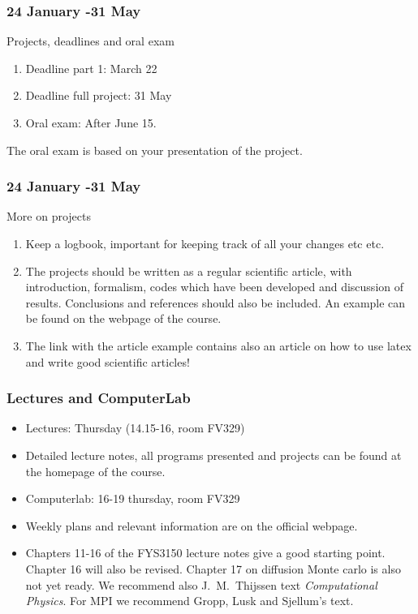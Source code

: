 \documentclass[compress]{beamer}
\begin{document}
\frame
{
  \frametitle{24 January -31 May}
  \begin{block}{Projects, deadlines and oral exam}
\begin{enumerate}
\item Deadline part 1: March  22
\item Deadline full project: 31 May
\item Oral exam: After June 15.
\end{enumerate}
The oral exam is based on your presentation of the project.
  \end{block}
} 


\frame
{
  \frametitle{24 January -31 May}
  \begin{block}{More on projects}
\begin{enumerate}
\item Keep  a logbook, important for keeping track of all your changes etc etc.
\item The projects should be written as a regular scientific article, with introduction, formalism, codes which have been developed and discussion of results.
Conclusions and references should also be included.  An example can be found on the webpage of the course.  
\item The link with the article example  contains also an article on how to use latex and write good scientific articles!
\end{enumerate}


  \end{block}
} 







\frame
{
  \frametitle{Lectures and ComputerLab}
  \begin{block}{}
\begin{itemize}
\item Lectures: Thursday (14.15-16, room FV329)
       \item Detailed lecture notes, all programs presented and projects
can be found at the homepage of the course.
       \item Computerlab: 16-19 thursday, room FV329
       \item Weekly plans and relevant information are on the official webpage.
\item Chapters 11-16 of the FYS3150 lecture notes give a good 
starting point.   Chapter 16 will also be revised. Chapter 17 on diffusion Monte carlo is also not yet ready.
We recommend also J.~M.~Thijssen  text {\em Computational Physics}.
For MPI we recommend Gropp, Lusk and Sjellum's text.
\end{itemize}
  \end{block}
}
\end{document}

